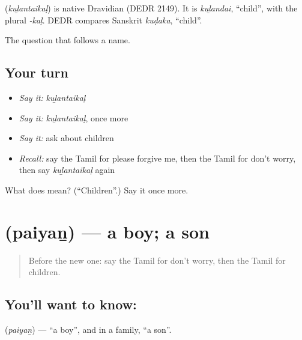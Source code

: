 \begin{cousinweb}
\textbf{} (\emph{kuḻantaikaḷ}) is native Dravidian (DEDR 2149). It is \emph{kuḻandai}, \textquotedblleft{}child\textquotedblright{}, with the plural \emph{-kaḷ}. DEDR compares Sanskrit \emph{kuḍaka}, \textquotedblleft{}child\textquotedblright{}.
\end{cousinweb}

\begin{grammarlens}[title={What you've built}]
The question that follows a name.
\end{grammarlens}

\subsection*{Your turn}
\begin{itemize}
\raggedright
  \item \emph{Say it:} \emph{kuḻantaikaḷ}
  \item \emph{Say it:} \emph{kuḻantaikaḷ}, once more
  \item \emph{Say it:} ask about children
  \item \emph{Recall:} say the Tamil for please forgive me, then the Tamil for don't worry, then say \emph{kuḻantaikaḷ} again
\end{itemize}

\begin{tcolorbox}[breakable,colback=teal!4,colframe=teal!35!black,title={Before you move on}]
What does  mean? (\textquotedblleft{}Children\textquotedblright{}.) Say it once more.
\end{tcolorbox}
\section[\texorpdfstring{\ta{பையன்} (paiyaṉ)}{பையன் (paiyaṉ)}]{ (paiyaṉ) — a boy; a son}

\label{lesson:TA-C100-boy}



\begin{quote}
Before the new one: say the Tamil for don't worry, then the Tamil for children.
\end{quote}

\subsection*{You'll want to know: }
\textbf{} (\emph{paiyaṉ}) — \textquotedblleft{}a boy\textquotedblright{}, and in a family, \textquotedblleft{}a son\textquotedblright{}.

